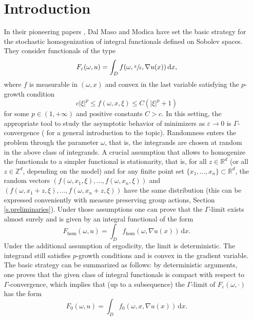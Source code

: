 \documentclass[10pt]{amsart}
\theoremstyle{definition}
\let\e\varepsilon
\let\w\omega
\newcommand{\dx}{\,\mathrm{d}x}
\newcommand{\R}{\mathbb{R}}
\newcommand{\Z}{\mathbb{Z}}
\begin{document}
\section{Introduction}
In their pioneering papers \cite{DMMoI,DMMoII}, Dal Maso and Modica have set the basic strategy for the stochastic homogenization of integral functionals defined on Sobolev spaces. They consider functionals of the type
\begin{equation}\label{eq:F_eps}
F_{\e}(\w,u)=\int_D f(\w,\sfrac{x}{\e},\nabla u(x))\dx,
\end{equation}
where $f$ is measurable in $(\w,x)$ and convex in the last variable satisfying the $p$-growth condition
\begin{equation}\label{eq:p-growth}
c|\xi|^p\leq f(\w,x,\xi)\leq C(|\xi|^p+1)
\end{equation}
for some $p\in (1,+\infty)$ and positive constants $C>c$. In this setting, the appropriate tool to study the asymptotic behavior of minimizers as $\e\to 0$ is $\Gamma$-convergence (\cf \cite{Br,DM} for a general introduction to the topic). Randomness enters the problem through the parameter $\w$, that is, the integrands are chosen at random in the above class of integrands. A crucial assumption that allows to homogenize the functionals to a simpler functional is stationarity, that is, for all $z\in\R^d$ (or all $z\in\Z^d$, depending on the model) and for any finite point set $\{x_1,\ldots,x_n\}\subset\R^d$, the random vectors $(f(\w,x_1,\xi),\ldots,f(\w,x_n,\xi))$ and $(f(\w,x_1+z,\xi),\ldots,f(\w,x_n+z,\xi))$ have the same distribution (this can be expressed conveniently with measure preserving group actions, \cf Section \ref{s.preliminaries}). Under those assumptions one can prove that the $\Gamma$-limit exists almost surely and is given by an integral functional of the form
\begin{equation*}
F_{\hom}(\w,u)=\int_D f_{\hom}(\w,\nabla u(x))\dx.
\end{equation*}
Under the additional assumption of ergodicity, the limit is deterministic. The integrand still satisfies $p$-growth conditions and is convex in the gradient variable. The basic strategy can be summarized as follows: by deterministic arguments, one proves that the given class of integral functionals is compact with respect to $\Gamma$-convergence, which implies that (up to a subsequence) the $\Gamma$-limit of $F_{\e}(\w,\cdot)$ has the form
\begin{equation*}
F_{0}(\w,u)=\int_D f_0(\w,x,\nabla u(x))\dx.
\end{equation*}
\end{document}
